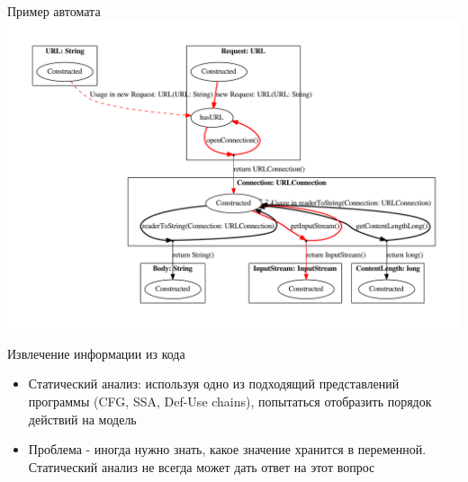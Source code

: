 \documentclass[12pt]{beamer}
\begin{document}
\begin{frame}{Пример автомата}
	\includegraphics[width=\textwidth]{extracted_java.pdf}
\end{frame}

{
\begin{frame}{Извлечение информации из кода}
  \begin{mybox}[]
  \begin{itemize}
  	\item Статический анализ: используя одно из подходящий представлений программы (CFG, SSA, Def-Use chains), попытаться отобразить порядок действий на модель
  	\item Проблема - иногда нужно знать, какое значение хранится в переменной. Статический анализ не всегда может дать ответ на этот вопрос
  \end{itemize}
  \end{mybox}
\end{frame}
}
\end{document}

